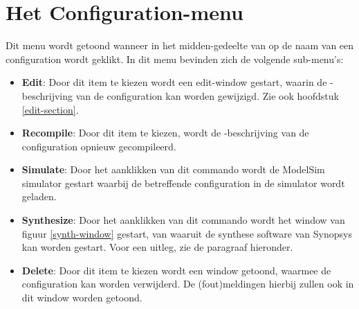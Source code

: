 \section{Het Configuration-menu}
Dit menu wordt getoond wanneer in het midden-gedeelte van 
op de naam van een configuration wordt geklikt.
In dit menu bevinden zich de volgende sub-menu's:
\begin{itemize}
\item {\bf Edit}: Door dit item te kiezen wordt een edit-window gestart, waarin de
             -beschrijving van de configuration kan worden gewijzigd.
Zie ook hoofdstuk \ref{edit-section}.
\item {\bf Recompile}: Door dit item te kiezen, wordt de -beschrijving van
                  de  configuration opnieuw gecompileerd.
\item {\bf Simulate}: Door het aanklikken van dit commando wordt de ModelSim simulator
               gestart waarbij de betreffende configuration in de simulator
               wordt geladen.
\item {\bf Synthesize}: Door het aanklikken van dit commando wordt het window van
	figuur \ref{synth-window} gestart, van waaruit de synthese
	software van Synopsys kan worden gestart.
	Voor een uitleg, zie de paragraaf hieronder.
\item {\bf Delete}: Door dit item te kiezen wordt een window getoond, waarmee de
             configuration kan worden verwijderd. De (fout)meldingen hierbij
             zullen ook in dit window worden getoond.
\end{itemize}

